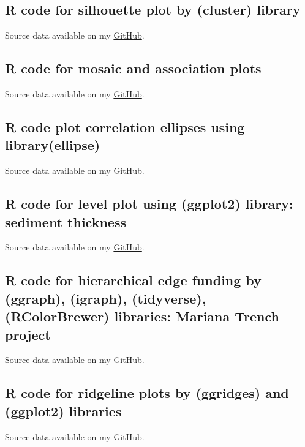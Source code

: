 \documentclass[11pt,a4paper]{report}
\begin{document}
{\begin{appendices}
\subsection{R code for silhouette plot by (cluster) library}\label{R:30}
Source data available on my \href{https://github.com/paulinelemenkova/30-R-Silhouette}{GitHub}.


\subsection{R code for mosaic and association plots}\label{R:31}
Source data available on my \href{https://github.com/paulinelemenkova/31-R-Mosaic-and-Association-Plots}{GitHub}.

\pagebreak

\subsection{R code plot correlation ellipses using library(ellipse)}\label{R:32}
Source data available on my \href{https://github.com/paulinelemenkova/32-R-Correlation-Ellipses}{GitHub}.


\subsection{R code for level plot using (ggplot2) library: sediment thickness}\label{R:33}
Source data available on my \href{https://github.com/paulinelemenkova/33-R-Levelplot-Heatmap}{GitHub}.

\pagebreak

\subsection{R code for hierarchical edge funding by (ggraph), (igraph), (tidyverse), (RColorBrewer) libraries: Mariana Trench project}\label{R:34}
Source data available on my \href{https://github.com/paulinelemenkova/34-R-Hierarchical-Edge-Bundling}{GitHub}.


\subsection{R code for ridgeline plots by (ggridges) and (ggplot2) libraries}\label{R:35}
Source data available on my \href{https://github.com/paulinelemenkova/35-R-Ridgelines}{GitHub}.



\end{appendices}}
\end{document}
